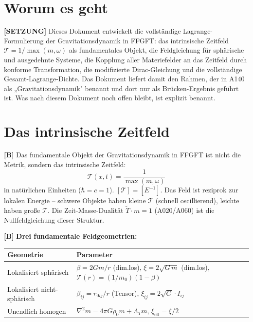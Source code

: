 \section{Worum es geht}

\textbf{[SETZUNG]} Dieses Dokument entwickelt die vollständige Lagrange-Formulierung
der Gravitationsdynamik in FFGFT: das intrinsische Zeitfeld $\mathcal T=1/\max(m,\omega)$
als fundamentales Objekt, die Feldgleichung für sphärische und ausgedehnte Systeme,
die Kopplung aller Materiefelder an das Zeitfeld durch konforme Transformation, die
modifizierte Dirac-Gleichung und die vollständige Gesamt-Lagrange-Dichte. Das Dokument
liefert damit den Rahmen, der in A140 als „Gravitationsdynamik" benannt und dort nur
als Brücken-Ergebnis geführt ist. Was nach diesem Dokument noch offen bleibt, ist
explizit benannt.

\section{Das intrinsische Zeitfeld}

\textbf{[B]} Das fundamentale Objekt der Gravitationsdynamik in FFGFT ist nicht die
Metrik, sondern das intrinsische Zeitfeld:
\[
  \boxed{\;\mathcal T(x,t) = \frac{1}{\max(m,\omega)}\;}
\]
in natürlichen Einheiten ($\hbar=c=1$). $[\mathcal T]=[E^{-1}]$. Das Feld ist
reziprok zur lokalen Energie -- schwere Objekte haben kleine $\mathcal T$ (schnell
oscillierend), leichte haben große $\mathcal T$. Die Zeit-Masse-Dualität
$\tilde T\cdot m=1$ (A020/A060) ist die Nullfeldgleichung dieser Struktur.

\textbf{[B]} \textbf{Drei fundamentale Feldgeometrien:}

\begin{center}
\renewcommand{\arraystretch}{1.3}
{\small
\begin{tabular}{ll}
\toprule
Geometrie & Parameter \\
\midrule
Lokalisiert sphärisch &
  $\beta=2Gm/r$ (dim.los), $\xi=2\sqrt{G\,m}$ (dim.los),
  $\mathcal T(r)=(1/m_0)(1-\beta)$ \\
Lokalisiert nicht-sphärisch &
  $\beta_{ij}=r_{0ij}/r$ (Tensor), $\xi_{ij}=2\sqrt G\cdot I_{ij}$ \\
Unendlich homogen &
  $\nabla^2 m=4\pi G\rho_0 m+\Lambda_T m$, $\xi_\text{eff}=\xi/2$ \\
\bottomrule
\end{tabular}
}
\renewcommand{\arraystretch}{1.0}
\end{center}

